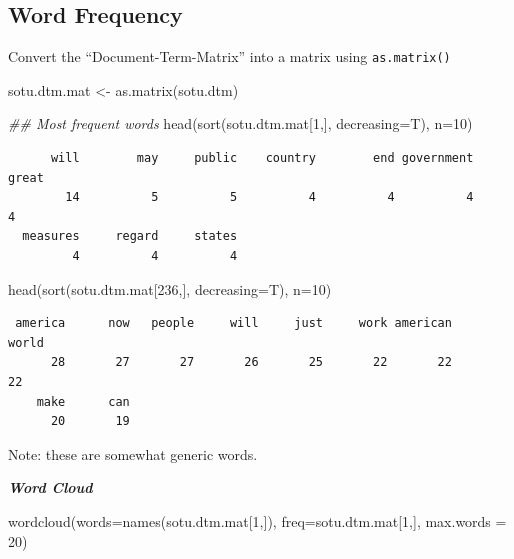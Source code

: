 \documentclass[
  letterpaper,
  DIV=11,
  numbers=noendperiod]{scrreprt}
\newenvironment{Shaded}{\begin{snugshade}}{\end{snugshade}}
\newcommand{\AttributeTok}[1]{\textcolor[rgb]{0.40,0.45,0.13}{#1}}
\newcommand{\DecValTok}[1]{\textcolor[rgb]{0.68,0.00,0.00}{#1}}
\newcommand{\DocumentationTok}[1]{\textcolor[rgb]{0.37,0.37,0.37}{\textit{#1}}}
\newcommand{\FunctionTok}[1]{\textcolor[rgb]{0.28,0.35,0.67}{#1}}
\newcommand{\NormalTok}[1]{\textcolor[rgb]{0.00,0.23,0.31}{#1}}
\newcommand{\OtherTok}[1]{\textcolor[rgb]{0.00,0.23,0.31}{#1}}
\begin{document}
\hypertarget{word-frequency}{%
\subsection{Word Frequency}\label{word-frequency}}

Convert the ``Document-Term-Matrix'' into a matrix using
\texttt{as.matrix()}

\begin{Shaded}
\begin{Highlighting}[]
\NormalTok{sotu.dtm.mat }\OtherTok{\textless{}{-}} \FunctionTok{as.matrix}\NormalTok{(sotu.dtm)}

\DocumentationTok{\#\# Most frequent words}
\FunctionTok{head}\NormalTok{(}\FunctionTok{sort}\NormalTok{(sotu.dtm.mat[}\DecValTok{1}\NormalTok{,], }\AttributeTok{decreasing=}\NormalTok{T), }\AttributeTok{n=}\DecValTok{10}\NormalTok{)}
\end{Highlighting}
\end{Shaded}

\begin{verbatim}
      will        may     public    country        end government      great 
        14          5          5          4          4          4          4 
  measures     regard     states 
         4          4          4 
\end{verbatim}

\begin{Shaded}
\begin{Highlighting}[]
\FunctionTok{head}\NormalTok{(}\FunctionTok{sort}\NormalTok{(sotu.dtm.mat[}\DecValTok{236}\NormalTok{,], }\AttributeTok{decreasing=}\NormalTok{T), }\AttributeTok{n=}\DecValTok{10}\NormalTok{)}
\end{Highlighting}
\end{Shaded}

\begin{verbatim}
 america      now   people     will     just     work american    world 
      28       27       27       26       25       22       22       22 
    make      can 
      20       19 
\end{verbatim}

Note: these are somewhat generic words.

\textbf{\emph{Word Cloud}}

\begin{Shaded}
\begin{Highlighting}[]
\FunctionTok{wordcloud}\NormalTok{(}\AttributeTok{words=}\FunctionTok{names}\NormalTok{(sotu.dtm.mat[}\DecValTok{1}\NormalTok{,]),}
          \AttributeTok{freq=}\NormalTok{sotu.dtm.mat[}\DecValTok{1}\NormalTok{,], }\AttributeTok{max.words =} \DecValTok{20}\NormalTok{)}
\end{Highlighting}
\end{Shaded}
\end{document}
